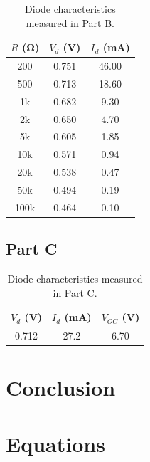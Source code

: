 \documentclass{article}
\begin{document}
\begin{table}[hbtp]
  \centering
  \begin{tabular}{ccc}
    $R$ (\si{\ohm}) & $V_d$ (\si{V}) & $I_d$ (\si{mA}) \\
    \hline
    200 & 0.751 & 46.00 \\
    500 & 0.713 & 18.60 \\
    1k & 0.682 & 9.30 \\
    2k & 0.650 & 4.70 \\
    5k & 0.605 & 1.85 \\
    10k & 0.571 & 0.94 \\
    20k & 0.538 & 0.47 \\
    50k & 0.494 & 0.19 \\
    100k & 0.464 & 0.10 \\
  \end{tabular}
  \caption{\label{tab:part_b} Diode characteristics measured in Part B.}
\end{table}

\subsection{Part C}
\label{sec:result_c}

\begin{table}[hbtp]
  \centering
  \begin{tabular}{ccc}
    $V_d$ (\si{V}) & $I_d$ (\si{mA}) & $V_{OC}$ (\si{V}) \\
    \hline
    0.712 & 27.2 & 6.70 \\
  \end{tabular}
  \caption{\label{tab:part_b} Diode characteristics measured in Part C.}
\end{table}

\section{Conclusion}
\label{sec:conclusion}

\section{Equations}
\label{sec:equations}
\end{document}
